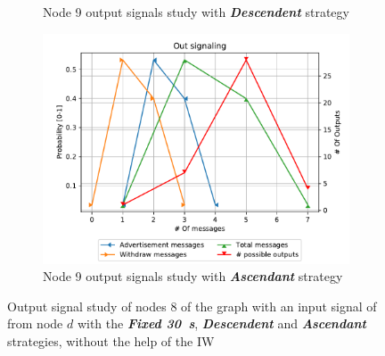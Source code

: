 \begin{figure}[ht]
\begin{subfigure}[b]{0.32\textwidth}
		 \caption{Node \num{9} output signals study with \textbf{\textit{Descendent}} strategy}
         \label{fig:signal_node9_fabrikant_descendent_noiw}
     \end{subfigure}
     \hfill
     \begin{subfigure}[b]{0.32\textwidth}
         \centering
         \includegraphics[width=\textwidth]{images/signal_study/fabrikant/Ascending.pdf}
		 \caption{Node \num{9} output signals study with \textbf{\textit{Ascendant}} strategy}
         \label{fig:signal_node9_fabrikant_ascendant_noIW}
     \end{subfigure}
		\caption{Output signal study of nodes \num{8} of the graph
			 with an input signal of  from node $d$
			with the \textbf{\textit{Fixed \SI{30}{\second}}}, \textbf{\textit{Descendent}}
			and \textbf{\textit{Ascendant}}	strategies, without the help of the \ac{IW}}
        \label{fig:signal_fabrikant}
\end{figure}

